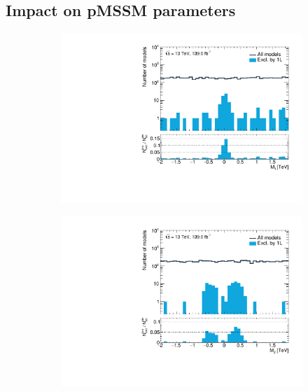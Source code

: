 \subsection{Impact on pMSSM parameters}\label{sec:impact_pmssm_parameters}

\begin{figure}
	\centering
	\begin{subfigure}[b]{0.5\linewidth}
		\centering\includegraphics[width=\textwidth]{1D/M1}
	\end{subfigure}\hfill
	\begin{subfigure}[b]{0.5\linewidth}
		\centering\includegraphics[width=\textwidth]{1D/M2}
	\end{subfigure}\hfill
	\begin{subfigure}[b]{0.5\linewidth}

\end{subfigure}
\end{figure}
